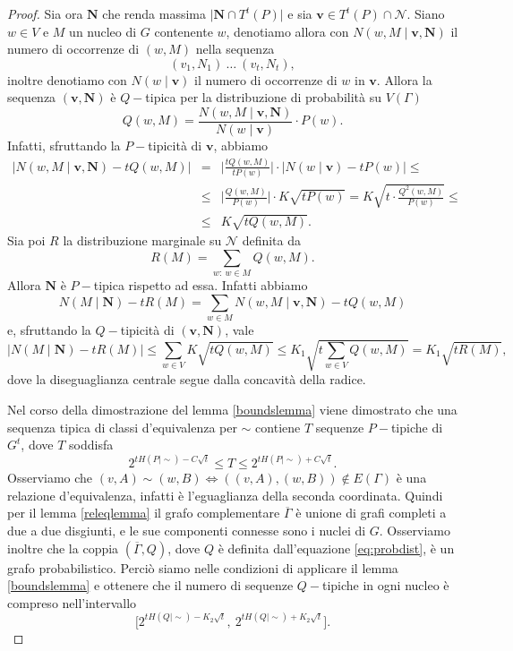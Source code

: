 \begin{proof}
	Sia ora \(\mathbf{N}\) che renda massima \(\big\vert \mathbf{N}\cap T^t(P) \big\vert\) e sia \(\mathbf{v}\in T^t(P)\cap \mathcal{N}\). Siano \(w\in V\) e \(M\) un nucleo di \(G\) contenente \(w\), denotiamo allora con \(N(w,M\mid \mathbf{v}, \mathbf{N})\) il numero di occorrenze di \((w,M)\) nella sequenza
	\[(v_1, N_1)\ \dots\ (v_t, N_t),\]
	inoltre denotiamo con \(N(w\mid \mathbf{v})\) il numero di occorrenze di \(w\) in \(\mathbf{v}\). Allora la sequenza \((\mathbf{v}, \mathbf{N})\) è \(Q-\)tipica per la distribuzione di probabilità su \(V(\Gamma)\) 
	\begin{equation}
		\label{eq:probdist} Q(w,M)=\frac{N(w,M\mid \mathbf{v}, \mathbf{N})}{N(w\mid \mathbf{v})}\cdot P(w). 
	\end{equation}
	Infatti, sfruttando la \(P-\)tipicità di \(\mathbf{v}\), abbiamo 
	\begin{eqnarray}
		\big\vert N(w,M\mid \mathbf{v}, \mathbf{N}) - tQ(w,M)\big\vert &=& \bigg\vert \frac{tQ(w,M)}{tP(w)}\bigg\vert \cdot \big\vert N(w\mid \mathbf{v}) - tP(w)\big\vert \le \nonumber \\
		&\le& \bigg\vert \frac{Q(w,M)}{P(w)}\bigg\vert \cdot K\sqrt{tP(w)} = K\sqrt{t\cdot\frac{Q^{2}(w,M)}{P(w)}} \le \nonumber \\
		&\le& K\sqrt{tQ(w,M)}. \nonumber 
	\end{eqnarray}
	Sia poi \(R\) la distribuzione marginale su \(\mathcal{N}\) definita da
	\[R(M)=\sum_{w:\ w\in M} Q(w,M).\]
	Allora \(\mathbf{N}\) è \(P-\)tipica rispetto ad essa. Infatti abbiamo
	\[N(M\mid \mathbf{N})-tR(M)=\sum_{w\in M} N(w,M\mid \mathbf{v},\mathbf{N})-tQ(w,M)\]
	e, sfruttando la \(Q-\)tipicità di \((\mathbf{v}, \mathbf{N})\), vale
	\[\big\vert N(M\mid \mathbf{N})-tR(M) \big\vert\le \sum_{w\in V} K\sqrt{tQ(w,M)}\le K_{1}\sqrt{t\sum_{w\in V} Q(w,M)}=K_{1}\sqrt{tR(M)},\]
	dove la diseguaglianza centrale segue dalla concavità della radice.
	
	Nel corso della dimostrazione del lemma \ref{boundslemma} viene dimostrato che una sequenza tipica di classi d'equivalenza per \(\sim\) contiene \(T\) sequenze \(P-\)tipiche di \(G^t\), dove \(T\) soddisfa
	\[2^{tH(P\mid\sim)-C\sqrt{t}}\le T\le 2^{tH(P\mid\sim)+C\sqrt{t}}.\]
	Osserviamo che \((v,A)\sim (w,B) \iff ((v,A),(w,B))\not\in E(\Gamma)\) è una relazione d'equivalenza, infatti è l'eguaglianza della seconda coordinata. Quindi per il lemma \ref{releqlemma} il grafo complementare \(\overline{\Gamma}\) è unione di grafi completi a due a due disgiunti, e le sue componenti connesse sono i nuclei di \(G\). Osserviamo inoltre che la coppia \((\overline{\Gamma}, Q)\), dove \(Q\) è definita dall'equazione \eqref{eq:probdist}, è un grafo probabilistico. Perciò siamo nelle condizioni di applicare il lemma \ref{boundslemma} e ottenere che il numero di sequenze \(Q-\)tipiche in ogni nucleo è compreso nell'intervallo 
	\begin{equation}
		\label{eq:bounds} \Big[2^{tH(Q\mid\sim)-K_{2}\sqrt{t}},\ 2^{tH(Q\mid\sim)+K_{2}\sqrt{t}}\Big]. 
	\end{equation}
	

\end{proof}
